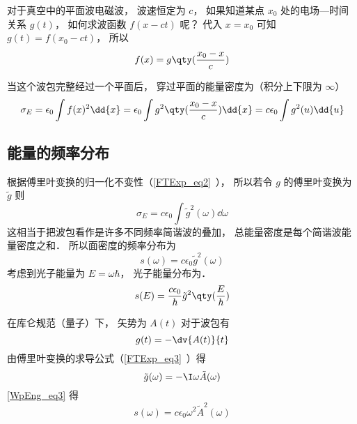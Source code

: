 

对于真空中的平面波电磁波， 波速恒定为 $c$， 如果知道某点 $x_0$ 处的电场—时间关系 $g(t)$， 如何求波函数 $f(x - ct)$ 呢？ 代入 $x = x_0$ 可知 $g(t) = f(x_0 - ct)$， 所以
\begin{equation}
f(x) = g\qty(\frac{x_0 - x}{c})
\end{equation}

当这个波包完整经过一个平面后， 穿过平面的能量密度为（积分上下限为 $\infty$）
\begin{equation}\label{WpEng_eq1}
\sigma_E = \epsilon_0 \int f(x)^2 \dd{x} = \epsilon_0  \int g^2\qty(\frac{x_0 - x}{c}) \dd{x} = c\epsilon_0 \int g^2(u) \dd{u}
\end{equation}

\subsection{能量的频率分布}
根据傅里叶变换的归一化不变性（\autoref{FTExp_eq2}~）， 所以若令 $g$ 的傅里叶变换为 $\tilde g$ 则
\begin{equation}
\sigma_E = c\epsilon_0 \int {\tilde g}^2(\omega) \dd{\omega}
\end{equation}
这相当于把波包看作是许多不同频率简谐波的叠加， 总能量密度是每个简谐波能量密度之和． 所以面密度的频率分布为
\begin{equation}\label{WpEng_eq3}
s(\omega) = c\epsilon_0 {\tilde g}^2(\omega)
\end{equation}
考虑到光子能量为 $E = \omega\hbar$， 光子能量分布为．
\begin{equation}\label{WpEng_eq2}
s(E) = \frac{c\epsilon_0}{\hbar} {\tilde g}^2\qty(\frac{E}{\hbar})
\end{equation}

在库仑规范（量子）下， 矢势为 $A(t)$ 对于波包有
\begin{equation}
g(t) = -\dv{A(t)}{t}
\end{equation}
由傅里叶变换的求导公式（\autoref{FTExp_eq3}~）得
\begin{equation}
\tilde g(\omega) = -\I \omega \tilde A(\omega)
\end{equation}
\autoref{WpEng_eq3} 得
\begin{equation}
s(\omega) = c\epsilon_0 \omega^2 {\tilde A}^2(\omega)
\end{equation}

